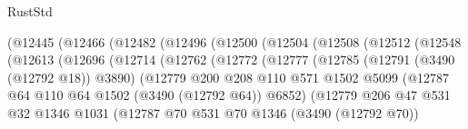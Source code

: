 \begin{lexlean}{RustStd}
\begin{coremodule}
                        (@12445
                          (@12466
                            (@12482
                              (@12496
                                (@12500
                                  (@12504
                                    (@12508
                                      (@12512
                                        (@12548
                                          (@12613
                                            (@12696
                                              (@12714
                                                (@12762
                                                  (@12772
                                                    (@12777
                                                      (@12785
                                                        (@12791 (@3490 (@12792 @18)) @3890)
                                                        (@12779
                                                          @200
                                                          @208
                                                          @110
                                                          @571
                                                          @1502
                                                          @5099
                                                          (@12787
                                                            @64
                                                            @110
                                                            @64
                                                            @1502
                                                            (@3490 (@12792 @64))
                                                            @6852)
                                                          (@12779
                                                            @206
                                                            @47
                                                            @531
                                                            @32
                                                            @1346
                                                            @1031
                                                            (@12787
                                                              @70
                                                              @531
                                                              @70
                                                              @1346
                                                              (@3490 (@12792 @70))

\end{coremodule}
\end{lexlean}
